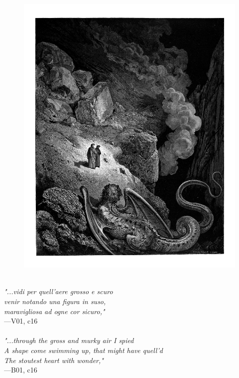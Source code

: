 \documentclass[../Dore_vision.tex]{subfiles}
\begin{document}
\begin{figure}[ht]
\centering
\includegraphics[height=\figsize]{illustrations/book_1/V01, c16.jpg}
\end{figure}

\begin{center}
\begin{minipage}{0.8\linewidth}
\textit{\\
"...vidi per quell’aere grosso e scuro\\venir notando una figura in suso,\\maravigliosa ad ogne cor sicuro,"} \\
—V01, c16 \\~\\
\textit{"...through the gross and murky air I spied\\A shape come swimming up, that might have quell'd\\The stoutest heart with wonder,"} \\
—B01, c16
\end{minipage}
\end{center}
\end{document}
